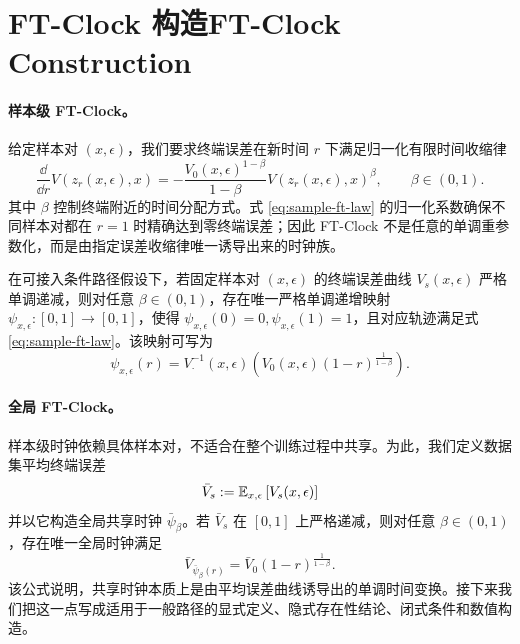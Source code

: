 \section{\ifinternalcn FT-Clock 构造\else FT-Clock Construction\fi}

\ifinternalcn
\paragraph{样本级 FT-Clock。}
给定样本对 $(x,\epsilon)$，我们要求终端误差在新时间 $r$ 下满足归一化有限时间收缩律
\begin{equation}
  \frac{\dd}{\dd r}V(z_r(x,\epsilon),x)
  =
  -\frac{V_0(x,\epsilon)^{1-\beta}}{1-\beta}V(z_r(x,\epsilon),x)^\beta,
  \qquad \beta \in (0,1).
  \label{eq:sample-ft-law}
\end{equation}
其中 $\beta$ 控制终端附近的时间分配方式。式 \eqref{eq:sample-ft-law} 的归一化系数确保不同样本对都在 $r=1$ 时精确达到零终端误差；因此 FT-Clock 不是任意的单调重参数化，而是由指定误差收缩律唯一诱导出来的时钟族。

\begin{theorem}
在可接入条件路径假设下，若固定样本对 $(x,\epsilon)$ 的终端误差曲线 $V_s(x,\epsilon)$ 严格单调递减，则对任意 $\beta \in (0,1)$，存在唯一严格单调递增映射 $\psi_{x,\epsilon}:[0,1]\to[0,1]$，使得 $\psi_{x,\epsilon}(0)=0,\psi_{x,\epsilon}(1)=1$，且对应轨迹满足式 \eqref{eq:sample-ft-law}。该映射可写为
\begin{equation}
  \psi_{x,\epsilon}(r)
  =
  V_{\cdot}^{-1}(x,\epsilon)
  \left(
    V_0(x,\epsilon)(1-r)^{\frac{1}{1-\beta}}
  \right).
\end{equation}
\end{theorem}

\paragraph{全局 FT-Clock。}
样本级时钟依赖具体样本对，不适合在整个训练过程中共享。为此，我们定义数据集平均终端误差
\begin{equation}
  \bar{V}_s := \mathbb{E}_{x,\epsilon}\left[V_s(x,\epsilon)\right]
\end{equation}
并以它构造全局共享时钟 $\bar{\psi}_{\beta}$。若 $\bar{V}_s$ 在 $[0,1]$ 上严格递减，则对任意 $\beta \in (0,1)$，存在唯一全局时钟满足
\begin{equation}
  \bar{V}_{\bar{\psi}_{\beta}(r)}
  =
  \bar{V}_0(1-r)^{\frac{1}{1-\beta}}.
  \label{eq:global-ft-clock}
\end{equation}
该公式说明，共享时钟本质上是由平均误差曲线诱导出的单调时间变换。接下来我们把这一点写成适用于一般路径的显式定义、隐式存在性结论、闭式条件和数值构造。

